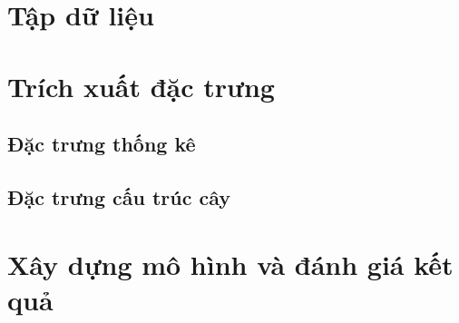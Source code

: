 \documentclass[./../main.tex]{subfiles}
\begin{document}
\section{Tập dữ liệu}
\section{Trích xuất đặc trưng}
\subsection{Đặc trưng thống kê}
\subsection{Đặc trưng cấu trúc cây}

\section{Xây dựng mô hình và đánh giá kết quả}
\end{document}
